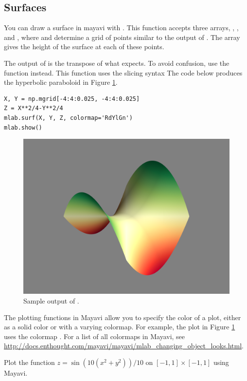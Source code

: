 \subsection*{Surfaces}
You can draw a surface in mayavi with .
This function accepts three arrays, , , and , where  and  determine a grid of points similar to the output of .
The array  gives the height of the surface at each of these points.

The output of  is the transpose of what  expects.
To avoid confusion, use the function  instead.
This function uses the slicing syntax  
The code below produces the hyperbolic paraboloid in Figure \ref{fig:surf_example}.

\begin{lstlisting}
X, Y = np.mgrid[-4:4:0.025, -4:4:0.025]
Z = X**2/4-Y**2/4
mlab.surf(X, Y, Z, colormap='RdYlGn')
mlab.show()
\end{lstlisting}


\begin{figure}
\includegraphics[width=.7\textwidth]{mesh_example.png}
\caption{Sample output of .}
\label{fig:surf_example}
\end{figure}

The plotting functions in Mayavi allow you to specify the color of a plot, either as a solid color or with a varying colormap.
For example, the plot in Figure \ref{fig:surf_example} uses the colormap .
For a list of all colormaps in Mayavi, see \url{http://docs.enthought.com/mayavi/mayavi/mlab_changing_object_looks.html}.

\begin{problem}
Plot the function $z = \sin(10(x^2+y^2))/10$ on $[-1,1] \times [-1,1]$ using Mayavi.
\end{problem}


